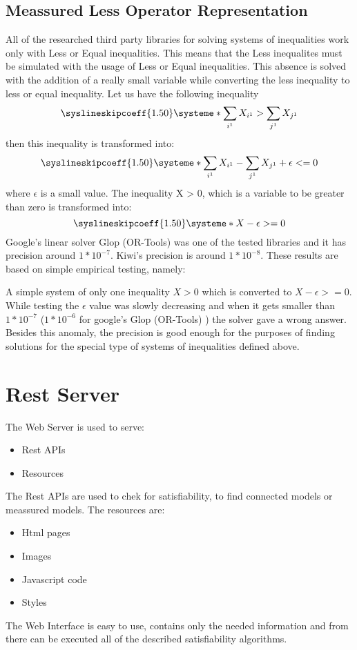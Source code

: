 \documentclass{article}
\begin{document}
		\subsection{Meassured Less Operator Representation}
		All of the researched third party libraries for solving systems of inequalities work only with Less or Equal inequalities.
		This means that the Less inequalites must be simulated with the usage of Less or Equal inequalities.
		\newline
		This absence is solved with the addition of a really small variable while converting the less inequality to 
		less or equal inequality.
		\newline
		Let us have the following inequality
		\[
			\syslineskipcoeff{1.50}
			\systeme*{\sum_{i^1} X_{i^1} > \sum_{j^1} X_{j^1}}
		\]
		then this inequality is transformed into:
		\[
			\syslineskipcoeff{1.50}
			\systeme*{\sum_{i^1} X_{i^1} - \sum_{j^1} X_{j^1}} + \epsilon <= 0 
		\]
		where $\epsilon$ is a small value.
		\newline
		The inequality X > 0, which is a variable to be greater than zero is transformed into:
		\[
			\syslineskipcoeff{1.50}
			\systeme*{X - \epsilon >= 0} 
		\]
		\newline
		Google's linear solver Glop (OR-Tools) was one of the tested libraries and it has precision around $1*10^{-7}$.
		Kiwi's precision is around $1*10^{-8}$. 
		\newline
		These results are based on simple empirical testing, namely:

		A simple system of only one inequality $X > 0$ which is converted to $X - \epsilon >= 0$. 
		While testing the $\epsilon$ value was slowly decreasing and when it gets smaller than $1*10^{-7}$
		($1*10^{-6}$ for google's Glop (OR-Tools) ) the solver gave a wrong answer.
		\newline
		\newline
		Besides this anomaly, the precision is good enough for the purposes of finding solutions for the special type
		of systems of inequalities defined above.
		
		
	\newpage
	\section{Rest Server}
		The Web Server is used to serve:
		\begin{itemize}
			\item Rest APIs
			\item Resources
		\end{itemize}
		The Rest APIs are used to chek for satisfiability, to find connected models or meassured models.
		\newline
		The resources are:
		\begin{itemize}
			\item Html pages
			\item Images 
			\item Javascript code
			\item Styles
		\end{itemize}
		The Web Interface is easy to use, contains only the needed information and from there 
		can be executed all of the described satisfiability algorithms.
\end{document}
